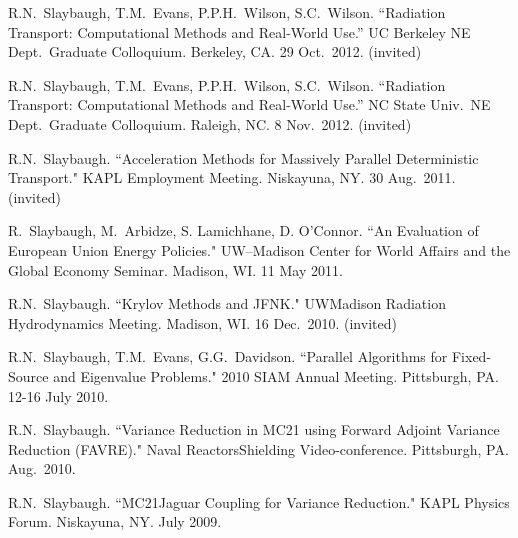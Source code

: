 \begin{bibsection}
\item R.N.\ Slaybaugh, T.M.\ Evans, P.P.H.\ Wilson, S.C.\ Wilson. ``Radiation Transport: Computational Methods and Real-World Use.'' UC Berkeley NE Dept.\ Graduate Colloquium. Berkeley, CA. 29 Oct.\ 2012. (invited)

\item R.N.\ Slaybaugh, T.M.\ Evans, P.P.H.\ Wilson, S.C.\ Wilson. ``Radiation Transport: Computational Methods and Real-World Use.'' NC State Univ.\ NE Dept.\ Graduate Colloquium. Raleigh, NC. 8 Nov.\ 2012. (invited)

\item R.N.\ Slaybaugh. ``Acceleration Methods for Massively Parallel Deterministic Transport." KAPL Employment Meeting. Niskayuna, NY. 30 Aug.\ 2011. (invited)

\item R.\ Slaybaugh, M.\ Arbidze, S. Lamichhane, D. O'Connor. ``An Evaluation of European Union Energy Policies." UW--Madison Center for World Affairs and the Global Economy Seminar. Madison, WI. 11 May 2011.

\item R.N.\ Slaybaugh. ``Krylov Methods and JFNK." UW\textemdash Madison Radiation Hydrodynamics Meeting. Madison, WI. 16 Dec.\ 2010. (invited)

\item R.N.\ Slaybaugh, T.M.\ Evans, G.G.\ Davidson. ``Parallel Algorithms for Fixed-Source and Eigenvalue Problems." 2010 SIAM Annual Meeting. Pittsburgh, PA. 12-16 July 2010.

\item R.N.\ Slaybaugh. ``Variance Reduction in MC21 using Forward Adjoint Variance Reduction (FAVRE)." Naval Reactors\textemdash Shielding Video-conference. Pittsburgh, PA. Aug.\ 2010.

\item R.N.\ Slaybaugh. ``MC21\textemdash Jaguar Coupling for Variance Reduction." KAPL Physics Forum. Niskayuna, NY. July 2009.

\end{bibsection}


